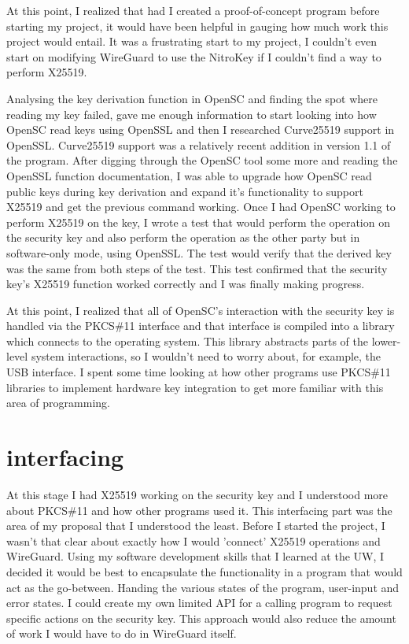 \documentclass [11pt, proquest] {uwthesis}[2020/02/24]
\begin{document}
At this point, I realized that had I created a proof-of-concept program before starting my project, it would have been helpful in gauging how much work this project would entail. It was a frustrating start to my project, I couldn't even start on modifying WireGuard to use the NitroKey if I couldn't find a way to perform X25519.

Analysing the key derivation function in OpenSC and finding the spot where reading my key failed, gave me enough information to start looking into how OpenSC read keys using OpenSSL and then I researched Curve25519 support in OpenSSL. Curve25519 support was a relatively recent addition in version 1.1 of the program\cite{noauthor_support_nodate}.
After digging through the OpenSC tool some more and reading the OpenSSL function documentation, I was able to upgrade how OpenSC read public keys during key derivation and expand it's functionality to support X25519 and get the previous command working.
Once I had OpenSC working to perform X25519 on the key, I wrote a test that would perform the operation on the security key and also perform the operation as the other party but in software-only mode, using OpenSSL. The test would verify that the derived key was the same from both steps of the test. This test confirmed that the security key's X25519 function worked correctly and I was finally making progress.

At this point, I realized that all of OpenSC's interaction with the security key is handled via the PKCS\#11 interface and that interface is compiled into a library which connects to the operating system. This library abstracts parts of the lower-level system interactions, so I wouldn't need to worry about, for example, the USB interface. I spent some time looking at how other programs use PKCS\#11 libraries to implement hardware key integration to get more familiar with this area of programming.

\section{interfacing}
At this stage I had X25519 working on the security key and I understood more about PKCS\#11 and how other programs used it. This interfacing part was the area of my proposal that I understood the least. Before I started the project, I wasn't that clear about exactly how I would 'connect' X25519 operations and WireGuard. Using my software development skills that I learned at the UW, I decided it would be best to encapsulate the functionality in a program that would act as the go-between. Handing the various states of the program, user-input and error states. I could create my own limited API for a calling program to request specific actions on the security key. This approach would also reduce the amount of work I would have to do in WireGuard itself.
\end{document}
